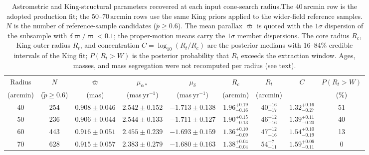 \documentclass{aa}
\providecommand{\DIFdeltex}[1]{{\protect\color[rgb]{0.65,0,0}\footnotesize #1}} %
\providecommand{\DIFdelFL}[1]{\DIFdel{#1}} %
\providecommand{\DIFaddbeginFL}{} %
\providecommand{\DIFaddendFL}{} %
\providecommand{\DIFdelbeginFL}{} %
\providecommand{\DIFdelendFL}{} %
\providecommand{\DIFdel}[1]{\texorpdfstring{\DIFdeltex{#1}}{}} %
\providecommand{\DIFscaledelfig}{0.5}
\newlength{\DIFdelgraphicswidth} %
\newlength{\DIFdelgraphicsheight} %
\providecommand{\DIFaddincludegraphics}[2][]{{\color{blue}\fbox{\DIFOincludegraphics[#1]{#2}}}} %
\providecommand{\DIFdelincludegraphics}[2][]{%
\sbox{\DIFdelgraphicsbox}{\DIFOincludegraphics[#1]{#2}}%
\settoboxwidth{\DIFdelgraphicswidth}{\DIFdelgraphicsbox} %
\settoboxtotalheight{\DIFdelgraphicsheight}{\DIFdelgraphicsbox} %
\scalebox{\DIFscaledelfig}{%
\parbox[b]{\DIFdelgraphicswidth}{\usebox{\DIFdelgraphicsbox}\\[-\baselineskip] \rule{\DIFdelgraphicswidth}{0em}}\llap{\resizebox{\DIFdelgraphicswidth}{\DIFdelgraphicsheight}{%
\setlength{\unitlength}{\DIFdelgraphicswidth}%
\begin{picture}(1,1)%
\thicklines\linethickness{2pt} %
{\color[rgb]{1,0,0}\put(0,0){\framebox(1,1){}}}%
{\color[rgb]{1,0,0}\put(0,0){\line( 1,1){1}}}%
{\color[rgb]{1,0,0}\put(0,1){\line(1,-1){1}}}%
\end{picture}%
}\hspace*{3pt}}} %
} %
\DeclareRobustCommand{\DIFaddbeginFL}{\DIFOaddbeginFL \let\includegraphics\DIFaddincludegraphics} %
\DeclareRobustCommand{\DIFaddendFL}{\DIFOaddendFL \let\includegraphics\DIFOincludegraphics} %
\DeclareRobustCommand{\DIFdelbeginFL}{\DIFOdelbeginFL \let\includegraphics\DIFdelincludegraphics} %
\DeclareRobustCommand{\DIFdelendFL}{\DIFOaddendFL \let\includegraphics\DIFOincludegraphics} %
\begin{document}
\begin{appendix}
\begin{table}
	\caption{Astrometric and King-structural parameters recovered at each input cone-search radius.\DIFdelbeginFL \DIFdelFL{The $40\,\mathrm{arcmin}$ row is the adopted production fit; the $50$--$70\,\mathrm{arcmin}$ rows use the same King priors applied to the wider-field reference samples. $N$ is the number of reference-sample candidates ($\tilde{p}\geq0.6$). The mean parallax $\bar{\varpi}$ is quoted with the $1\sigma$ dispersion of the subsample with $\delta\varpi/\varpi<0.1$; the proper-motion means carry the $1\sigma$ member dispersions. The core radius $R_c$, King outer radius $R_t$, and concentration $C=\log_{10}(R_t/R_c)$ are the posterior medians with 16--84\% credible intervals of the King fit; $P(R_t>W)$ is the posterior probability that $R_t$ exceeds the extraction window. Ages, masses, and mass segregation were not recomputed per radius (see text).}\DIFdelendFL }
	\centering
	\begin{tabular}{ccccccccc}
		\hline
		Radius & $N$ & $\bar{\varpi}$ & $\mu_{\alpha*}$ & $\mu_{\delta}$ & $R_c$ & $R_t$ & $C$ & $P(R_t>W)$ \\
		(arcmin) & ($\tilde{p}\geq0.6$) & (mas) & (mas\,yr$^{-1}$) & (mas\,yr$^{-1}$) & (arcmin) & (arcmin) &  & (\%) \\
		\hline
		40 & 254 & $0.908\pm0.046$ & $2.542\pm0.152$ & $-1.713\pm0.138$ & $1.96^{+0.19}_{-0.16}$ & $40^{+16}_{-17}$ & $1.32^{+0.16}_{-0.27}$ & 51 \\
		50 & 236 & $0.906\pm0.044$ & $2.544\pm0.133$ & $-1.711\pm0.127$ & $1.90^{+0.15}_{-0.13}$ & $46^{+12}_{-16}$ & $1.39^{+0.11}_{-0.20}$ & 40 \\
		60 & 443 & $0.916\pm0.051$ & $2.455\pm0.239$ & $-1.693\pm0.159$ & $1.36^{+0.10}_{-0.09}$ & $47^{+12}_{-16}$ & $1.54^{+0.10}_{-0.19}$ & 13 \\
		70 & 628 & $0.915\pm0.057$ & $2.383\pm0.279$ & $-1.680\pm0.163$ & $1.38^{+0.04}_{-0.04}$ & $54^{+7}_{-11}$  & $1.59^{+0.06}_{-0.11}$ & 0 \\
		\hline
	\end{tabular}%
\DIFaddbeginFL {}\DIFaddendFL %
	\label{tab:cone_params}
\end{table}

\end{appendix}
\end{document}
